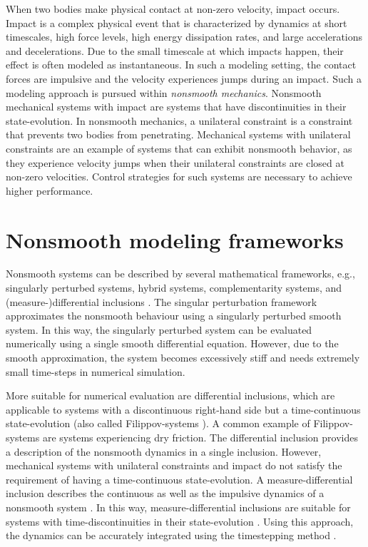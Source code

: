 \documentclass[../DC2017114Bouma.tex]{subfiles}
\begin{document}
When two bodies make physical contact at non-zero velocity, impact occurs. Impact is a complex physical event that is characterized by dynamics at short timescales, high force levels, high energy dissipation rates, and large accelerations and decelerations. Due to the small timescale at which impacts happen, their effect is often modeled as instantaneous. In such a modeling setting, the contact forces are impulsive and the velocity experiences jumps during an impact. Such a modeling approach is pursued within \textit{nonsmooth mechanics}. Nonsmooth mechanical systems with impact are systems that have discontinuities in their state-evolution. In nonsmooth mechanics, a unilateral constraint is a constraint that prevents two bodies from penetrating. Mechanical systems with unilateral constraints are an example of systems that can exhibit nonsmooth behavior, as they experience velocity jumps when their unilateral constraints are closed at non-zero velocities. Control strategies for such systems are necessary to achieve higher performance.

\section{Nonsmooth modeling frameworks}
Nonsmooth systems can be described by several mathematical frameworks, e.g., singularly perturbed systems, hybrid systems, complementarity systems, and (measure-)differential inclusions \cite{Leine2004}. The singular perturbation framework approximates the nonsmooth behaviour using a singularly perturbed smooth system. In this way, the singularly perturbed system can be evaluated numerically using a single smooth differential equation. However, due to the smooth approximation, the system becomes excessively stiff and needs extremely small time-steps in numerical simulation. 

More suitable for numerical evaluation are differential inclusions, which are applicable to systems with a discontinuous right-hand side but a time-continuous state-evolution (also called Filippov-systems \cite{Filippov1988}). A common example of Filippov-systems are systems experiencing dry friction. The differential inclusion provides a description of the nonsmooth dynamics in a single inclusion. However, mechanical systems with unilateral constraints and impact do not satisfy the requirement of having a time-continuous state-evolution. A measure-differential inclusion describes the continuous as well as the impulsive dynamics of a nonsmooth system \cite{Leine2008b}. In this way, measure-differential inclusions are suitable for systems with time-discontinuities in their state-evolution \cite{Moreau1988,Brogliato1999}. Using this approach, the dynamics can be accurately integrated using the timestepping method \cite{Wouwa}. 
\end{document}
